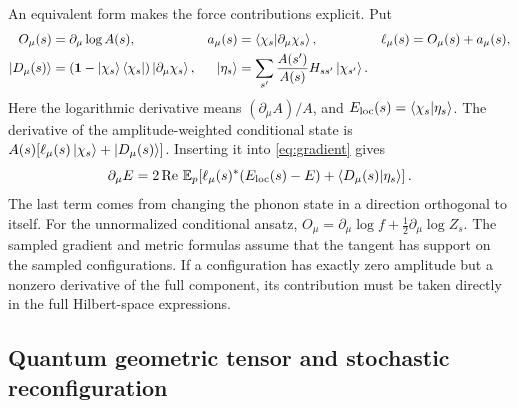 \documentclass[../../main.tex]{subfiles}
\begin{document}
An equivalent form makes the force contributions explicit. Put
\begin{align}
 O_\mu(s)&=\partial_\mu\log A(s),&
 a_\mu(s)&=\left\langle \chi_s \middle| \partial_\mu\chi_s \right\rangle,&
 \ell_\mu(s)&=O_\mu(s)+a_\mu(s), \notag\\
 \left\lvert D_\mu(s) \right\rangle&=(\mathbf{1}-\left\lvert \chi_s \right\rangle\left\langle \chi_s \right\rvert)\left\lvert \partial_\mu\chi_s \right\rangle,&
 \left\lvert \eta_s \right\rangle&=\sum_{s'}\frac{A(s')}{A(s)}H_{ss'}\left\lvert \chi_{s'} \right\rangle.
 \label{eq:tangents}
\end{align}
Here the logarithmic derivative means \((\partial_\mu A)/A\), and
\(E_{\mathrm{loc}}(s)=\left\langle \chi_s \middle| \eta_s \right\rangle\).
The derivative of the amplitude-weighted conditional state is
\(A(s)[\ell_\mu(s)\left\lvert \chi_s \right\rangle+\left\lvert D_\mu(s) \right\rangle]\). Inserting it into
\cref{eq:gradient} gives
\begin{equation}
 \partial_\mu E
   = 2\operatorname{Re}\,\mathbb{E}_p\!\left[
        \ell_\mu(s)^*(E_{\mathrm{loc}}(s)-E)
        +\left\langle D_\mu(s) \middle| \eta_s \right\rangle
      \right].
 \label{eq:force-decomp}
\end{equation}
The last term comes from changing the phonon state in a direction
orthogonal to itself. For the unnormalized conditional ansatz,
\(O_\mu=\partial_\mu\log f+\frac12\partial_\mu\log Z_s\).
The sampled gradient and metric formulas assume that the tangent has
support on the sampled configurations. If a configuration has exactly
zero amplitude but a nonzero derivative of the full component, its
contribution must be taken directly in the full Hilbert-space
expressions.

\subsection{Quantum geometric tensor and stochastic reconfiguration}
\label{sec:qgt}
\end{document}
